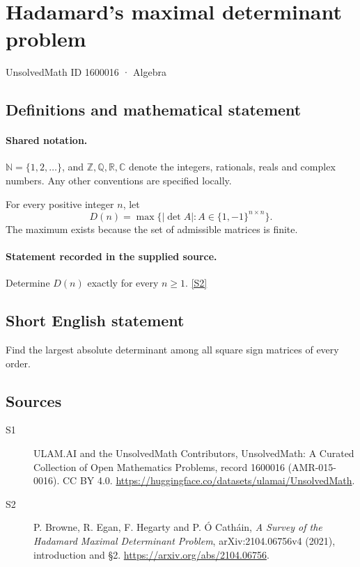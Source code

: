 \documentclass[11pt]{article}
\newcommand{\sref}[2]{\hyperlink{source:#1:#2}{[S#2]}}
\begin{document}
\setcounter{section}{1600015}
\section{Hadamard's maximal determinant problem}\label{1600016}
{\small\sffamily UnsolvedMath ID 1600016 · Algebra}
\subsection{Definitions and mathematical statement}

\paragraph{Shared notation.}$\mathbb N=\{1,2,\ldots\}$, and $\mathbb Z,\mathbb Q,\mathbb R,\mathbb C$ denote the integers, rationals, reals and complex numbers. Any other conventions are specified locally.


For every positive integer $n$, let
\[D(n)=\max\{|\det A|:A\in\{1,-1\}^{n\times n}\}.
\]
The maximum exists because the set of admissible matrices is finite.
\paragraph{Statement recorded in the supplied source.}
Determine $D(n)$ exactly for every $n\geq1$. \sref{1600016}{2}
\subsection{Short English statement}
Find the largest absolute determinant among all square sign matrices of every order.
\subsection{Sources}
\begin{description}
\item[\hypertarget{source:1600016:1}{S1}] ULAM.AI and the UnsolvedMath Contributors, UnsolvedMath: A Curated Collection of Open Mathematics Problems, record 1600016 (AMR-015-0016). CC BY 4.0. \url{https://huggingface.co/datasets/ulamai/UnsolvedMath}.
\item[\hypertarget{source:1600016:2}{S2}] P. Browne, R. Egan, F. Hegarty and P. Ó Catháin, \emph{A Survey of the Hadamard Maximal Determinant Problem}, arXiv:2104.06756v4 (2021), introduction and §2. \url{https://arxiv.org/abs/2104.06756}.
\end{description}
\label{end:1600016}
\end{document}
